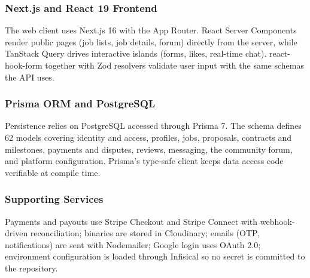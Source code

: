 \subsubsection{Next.js and React 19 Frontend}

The web client uses Next.js 16 with the App Router. React Server Components render public pages (job lists, job details, forum) directly from the server, while TanStack Query drives interactive islands (forms, likes, real-time chat). react-hook-form together with Zod resolvers validate user input with the same schemas the API uses.

\subsubsection{Prisma ORM and PostgreSQL}

Persistence relies on PostgreSQL accessed through Prisma 7. The schema defines 62 models covering identity and access, profiles, jobs, proposals, contracts and milestones, payments and disputes, reviews, messaging, the community forum, and platform configuration. Prisma's type-safe client keeps data access code verifiable at compile time.

\subsubsection{Supporting Services}

Payments and payouts use Stripe Checkout and Stripe Connect with webhook-driven reconciliation; binaries are stored in Cloudinary; emails (OTP, notifications) are sent with Nodemailer; Google login uses OAuth 2.0; environment configuration is loaded through Infisical so no secret is committed to the repository.
